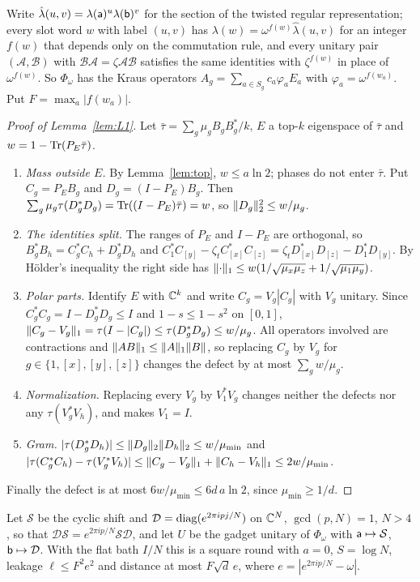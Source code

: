 Write $\hat\lambda(u,v)=\lambda(\mathsf a)^u\lambda(\mathsf b)^v$ for the section of the twisted regular representation; every slot word $w$ with label $(u,v)$ has
$\lambda(w)=\omega^{f(w)}\hat\lambda(u,v)$ for an integer $f(w)$ that depends only on the commutation rule, and every unitary pair $(\mathcal A,\mathcal B)$ with
$\mathcal B\mathcal A=\zeta\mathcal A\mathcal B$ satisfies the same identities with $\zeta^{f(w)}$ in place of $\omega^{f(w)}$. So $\Phi_\omega$ has the Kraus operators
$A_g=\sum_{a\in S_g}c_a\varphi_aE_a$ with $\varphi_a=\omega^{f(w_a)}$. Put $F=\max_a|f(w_a)|$.

\begin{proof}[Proof of Lemma~\ref{lem:L1}]
Let $\bar\tau=\sum_g\mu_gB_gB_g^*/k$, $E$ a top-$k$ eigenspace of $\bar\tau$ and $w=1-\operatorname{Tr}(P_E\bar\tau)$.
\begin{enumerate}[label=\arabic*.,itemsep=1pt]
\item \emph{Mass outside $E$.} By Lemma~\ref{lem:top}, $w\le a\ln2$; phases do not enter $\bar\tau$. Put $C_g=P_EB_g$ and $D_g=(I-P_E)B_g$. Then
$\sum_g\mu_g\tau(D_g^*D_g)=\operatorname{Tr}((I-P_E)\bar\tau)=w$, so $\lVert D_g\rVert_2^2\le w/\mu_g$.
\item \emph{The identities split.} The ranges of $P_E$ and $I-P_E$ are orthogonal, so $B_g^*B_h=C_g^*C_h+D_g^*D_h$ and
$C_1^*C_{[y]}-\zeta_tC_{[x]}^*C_{[z]}=\zeta_tD_{[x]}^*D_{[z]}-D_1^*D_{[y]}$. By H\"older's inequality the right side has $\lVert \cdot\rVert_1\le w(1/\sqrt{\mu_x\mu_z}+1/\sqrt{\mu_1\mu_y})$.
\item \emph{Polar parts.} Identify $E$ with $\mathbb C^k$ and write $C_g=V_g|C_g|$ with $V_g$ unitary. Since $C_g^*C_g=I-D_g^*D_g\le I$ and $1-s\le1-s^2$ on $[0,1]$,
$\lVert C_g-V_g\rVert_1=\tau(I-|C_g|)\le\tau(D_g^*D_g)\le w/\mu_g$. All operators involved are contractions and $\lVert AB\rVert_1\le\lVert A\rVert_1\lVert B\rVert$, so replacing $C_g$ by $V_g$ for
$g\in\{1,[x],[y],[z]\}$ changes the defect by at most $\sum_gw/\mu_g$.
\item \emph{Normalization.} Replacing every $V_g$ by $V_1^*V_g$ changes neither the defects nor any $\tau(V_g^*V_h)$, and makes $V_1=I$.
\item \emph{Gram.} $|\tau(D_g^*D_h)|\le\lVert D_g\rVert_2\lVert D_h\rVert_2\le w/\mu_{\min}$ and $|\tau(C_g^*C_h)-\tau(V_g^*V_h)|\le\lVert C_g-V_g\rVert_1+\lVert C_h-V_h\rVert_1\le2w/\mu_{\min}$.
\end{enumerate}
Finally the defect is at most $6w/\mu_{\min}\le6d\,a\ln2$, since $\mu_{\min}\ge1/d$.
\end{proof}

\begin{lemma}\label{lem:thin}
Let $\mathcal S$ be the cyclic shift and $\mathcal D=\operatorname{diag}(e^{2\pi ipj/N})$ on $\mathbb C^N$, $\gcd(p,N)=1$, $N>4$, so that $\mathcal D\mathcal S=e^{2\pi ip/N}\mathcal S\mathcal D$, and let
$U$ be the gadget unitary of $\Phi_\omega$ with $\mathsf a\mapsto\mathcal S$, $\mathsf b\mapsto\mathcal D$. With the flat bath $I/N$ this is a square round with $a=0$, $S=\log N$, leakage $\ell\le F^2e^2$ and distance at most
$F\sqrt d\,e$, where $e=|e^{2\pi ip/N}-\omega|$.
\end{lemma}

